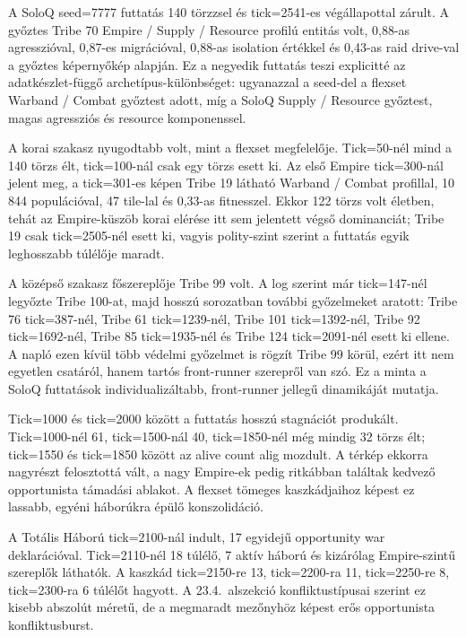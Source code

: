 ﻿\documentclass[a4paper,12pt]{report}
\begin{document}
A SoloQ seed=7777 futtatás 140 törzzsel és tick=2541-es végállapottal zárult. A győztes Tribe 70 Empire / Supply / Resource profilú entitás volt, 0,88-as agresszióval, 0,87-es migrációval, 0,88-as isolation értékkel és 0,43-as raid drive-val a győztes képernyőkép alapján. Ez a negyedik futtatás teszi explicitté az adatkészlet-függő archetípus-különbséget: ugyanazzal a seed-del a flexset Warband / Combat győztest adott, míg a SoloQ Supply / Resource győztest, magas agressziós és resource komponenssel.

A korai szakasz nyugodtabb volt, mint a flexset megfelelője. Tick=50-nél mind a 140 törzs élt, tick=100-nál csak egy törzs esett ki. Az első Empire tick=300-nál jelent meg, a tick=301-es képen Tribe 19 látható Warband / Combat profillal, 10\,844 populációval, 47 tile-lal és 0,33-as fitnesszel. Ekkor 122 törzs volt életben, tehát az Empire-küszöb korai elérése itt sem jelentett végső dominanciát; Tribe 19 csak tick=2505-nél esett ki, vagyis polity-szint szerint a futtatás egyik leghosszabb túlélője maradt.

A középső szakasz főszereplője Tribe 99 volt. A log szerint már tick=147-nél legyőzte Tribe 100-at, majd hosszú sorozatban további győzelmeket aratott: Tribe 76 tick=387-nél, Tribe 61 tick=1239-nél, Tribe 101 tick=1392-nél, Tribe 92 tick=1692-nél, Tribe 85 tick=1935-nél és Tribe 124 tick=2091-nél esett ki ellene. A napló ezen kívül több védelmi győzelmet is rögzít Tribe 99 körül, ezért itt nem egyetlen csatáról, hanem tartós front-runner szerepről van szó. Ez a minta a SoloQ futtatások individualizáltabb, front-runner jellegű dinamikáját mutatja.

Tick=1000 és tick=2000 között a futtatás hosszú stagnációt produkált. Tick=1000-nél 61, tick=1500-nál 40, tick=1850-nél még mindig 32 törzs élt; tick=1550 és tick=1850 között az alive count alig mozdult. A térkép ekkorra nagyrészt felosztottá vált, a nagy Empire-ek pedig ritkábban találtak kedvező opportunista támadási ablakot. A flexset tömeges kaszkádjaihoz képest ez lassabb, egyéni háborúkra épülő konszolidáció.

A Totális Háború tick=2100-nál indult, 17 egyidejű opportunity war deklarációval. Tick=2110-nél 18 túlélő, 7 aktív háború és kizárólag Empire-szintű szereplők láthatók. A kaszkád tick=2150-re 13, tick=2200-ra 11, tick=2250-re 8, tick=2300-ra 6 túlélőt hagyott. A 23.4.~alszekció konfliktustípusai szerint ez kisebb abszolút méretű, de a megmaradt mezőnyhöz képest erős opportunista konfliktusburst.
\end{document}
